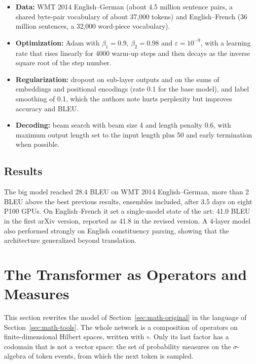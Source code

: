 \begin{itemize}
\tightlist
\item
  \textbf{Data:} WMT 2014 English--German (about 4.5 million sentence
  pairs, a shared byte-pair vocabulary of about 37,000 tokens) and
  English--French (36 million sentences, a 32,000 word-piece
  vocabulary).
\item
  \textbf{Optimization:} Adam with \(\beta_{1} = 0.9\), \(\beta_{2} = 0.98\) and
  \(\varepsilon = 10^{-9}\), with a learning rate that rises linearly for 4000
  warm-up steps and then decays as the inverse square root of the step
  number.
\item
  \textbf{Regularization:} dropout on sub-layer outputs and on the sums
  of embeddings and positional encodings (rate 0.1 for the base model),
  and label smoothing of 0.1, which the authors note hurts perplexity
  but improves accuracy and BLEU.
\item
  \textbf{Decoding:} beam search with beam size 4 and length penalty
  0.6, with maximum output length set to the input length plus 50 and
  early termination when possible.
\end{itemize}

\subsection{Results}\label{sec:math:II9}

The big model reached 28.4 BLEU on WMT 2014 English--German, more than 2
BLEU above the best previous results, ensembles included, after 3.5 days
on eight P100 GPUs. On English--French it set a single-model state of
the art: 41.0 BLEU in the first arXiv version, reported as 41.8 in the
revised version. A 4-layer model also performed strongly on English
constituency parsing, showing that the architecture generalized beyond
translation.

\section{The Transformer as Operators and Measures}\label{sec:math-operators}

This section rewrites the model of Section~\ref{sec:math-original} in the language of
Section~\ref{sec:math-tools}. The
whole network is a composition of operators on finite-dimensional
Hilbert spaces, written with \(\circ\). Only its last factor has a codomain that
is not a vector space: the set of probability measures on the \(\sigma\)-algebra
of token events, from which the next token is sampled.

